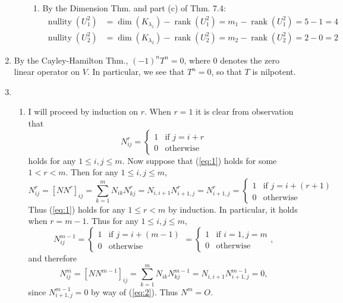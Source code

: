 \documentclass[12pt]{article}
\DeclareMathOperator{\rank}{rank}
\DeclareMathOperator{\nullity}{nullity}
\begin{document}
\begin{enumerate}
\begin{enumerate}
\begin{enumerate}[label=(\roman*)]
\item
By the Dimension Thm. and part (c) of Thm. 7.4:
\begin{align*}
\nullity(U_1^2) &= \dim(K_{\lambda_1}) - \rank(U_1^2) = m_1 - \rank(U_1^2) = 5 - 1 = 4 \\
\nullity(U_2^2) &= \dim(K_{\lambda_2}) - \rank(U_2^2) = m_2 - \rank(U_2^2) = 2 - 0 = 2
\end{align*}

\end{enumerate}

\end{enumerate}

\setcounter{enumi}{13}
\item
By the Cayley-Hamilton Thm., $(-1)^nT^n = 0$, where $0$ denotes the zero linear operator on $V$. In particular, we see that $T^n = 0$, so that $T$ is nilpotent.

\setcounter{enumi}{18}
\item
\begin{enumerate}
\item
I will proceed by induction on $r$. When $r = 1$ it is clear from observation that
\begin{equation} \label{eq:1}
N_{ij}^r = \begin{cases}
1 & \text{if } j = i + r \\
0 & \text{otherwise}
\end{cases}
\end{equation}
holds for any $1 \leq i, j \leq m$. Now suppose that (\ref{eq:1}) holds for some $1 < r < m$. Then for any $1 \leq i, j \leq m$,
\begin{equation*}
N_{ij}^r = [N N^r]_{ij} = \sum_{k=1}^m N_{ik} N_{kj}^r = N_{i,i+1} N_{i+1,j}^r = N_{i+1,j}^r
= \begin{cases}
1 & \text{if } j = i + (r + 1) \\
0 & \text{otherwise}
\end{cases}
\end{equation*}
Thus (\ref{eq:1}) holds for any $1 \leq r < m$ by induction. In particular, it holds when $r = m - 1$. Thus for any $1 \leq i, j \leq m$,
\begin{equation} \label{eq:2}
N_{ij}^{m-1} = \begin{cases}
1 & \text{if } j = i + (m - 1) \\
0 & \text{otherwise}
\end{cases}
= \begin{cases}
1 & \text{if } i = 1, j = m \\
0 & \text{otherwise}
\end{cases},
\end{equation}
and therefore
\begin{equation*}
N_{ij}^m = [N N^{m-1}]_{ij} = \sum_{k=1}^m N_{ik} N_{kj}^{m-1} = N_{i,i+1} N_{i+1,j}^{m-1} = 0,
\end{equation*}
since $N_{i+1,j}^{m-1} = 0$ by way of (\ref{eq:2}). Thus $N^m = O$.

\end{enumerate}

\end{enumerate}
\end{document}
